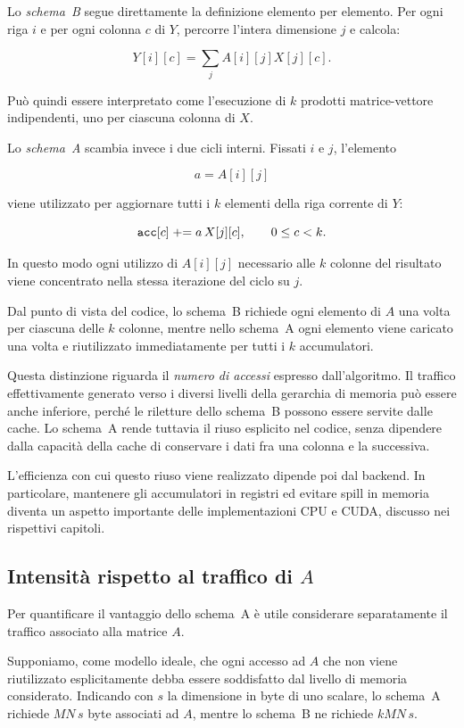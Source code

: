 Lo \emph{schema~B} segue direttamente la definizione elemento per elemento.
Per ogni riga $i$ e per ogni colonna $c$ di $Y$, percorre l'intera
dimensione $j$ e calcola:

\[
Y[i][c]
=
\sum_j A[i][j]X[j][c].
\]

Può quindi essere interpretato come l'esecuzione di $k$ prodotti
matrice-vettore indipendenti, uno per ciascuna colonna di $X$.

Lo \emph{schema~A} scambia invece i due cicli interni. Fissati $i$ e $j$,
l'elemento

\[
a=A[i][j]
\]

viene utilizzato per aggiornare tutti i $k$ elementi della riga corrente
di $Y$:

\[
\texttt{acc}[c]
\mathrel{+}=
a\,X[j][c],
\qquad
0\le c<k.
\]

In questo modo ogni utilizzo di $A[i][j]$ necessario alle $k$ colonne del
risultato viene concentrato nella stessa iterazione del ciclo su $j$.

Dal punto di vista del codice, lo schema~B richiede ogni elemento di $A$
una volta per ciascuna delle $k$ colonne, mentre nello schema~A ogni
elemento viene caricato una volta e riutilizzato immediatamente per tutti
i $k$ accumulatori.

Questa distinzione riguarda il \emph{numero di accessi} espresso
dall'algoritmo. Il traffico effettivamente generato verso i diversi livelli
della gerarchia di memoria può essere anche inferiore, perché le riletture dello
schema~B possono essere servite dalle cache. Lo schema~A rende tuttavia il
riuso esplicito nel codice, senza dipendere dalla capacità della cache di
conservare i dati fra una colonna e la successiva.

L'efficienza con cui questo riuso viene realizzato dipende poi dal backend.
In particolare, mantenere gli accumulatori in registri ed evitare spill in
memoria diventa un aspetto importante delle implementazioni CPU e CUDA,
discusso nei rispettivi capitoli.

\subsection{Intensità rispetto al traffico di $A$}

Per quantificare il vantaggio dello schema~A è utile considerare
separatamente il traffico associato alla matrice $A$.

Supponiamo, come modello ideale, che ogni accesso ad $A$ che non viene
riutilizzato esplicitamente debba essere soddisfatto dal livello di memoria
considerato. Indicando con $s$ la dimensione in byte di uno scalare, lo
schema~A richiede $MN\,s$ byte associati ad $A$, mentre lo schema~B ne richiede $kMN\,s.$

